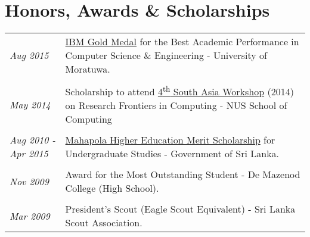 \documentclass[a4paper,10pt]{article}
\begin{document}




\section{Honors, Awards \& Scholarships}
\begin{tabular}{p{3cm}p{13.5cm}}
\emph{Aug 2015} & \href{https://goo.gl/Q3SrQX}{IBM Gold Medal} for the Best Academic Performance in Computer Science \& Engineering - University of Moratuwa.\\\\
\emph{May 2014} & Scholarship to attend \href{https://goo.gl/lDpCe5}{4\textsuperscript{th} South Asia Workshop} (2014) on Research Frontiers in Computing - NUS School of Computing\\\\
\emph{Aug 2010 - Apr 2015} & \href{http://www.gic.gov.lk/gic/index.php?option=com_info&id=1644&task=info&lang=en}{Mahapola Higher Education Merit Scholarship} for Undergraduate Studies - Government of Sri Lanka.\\\\
\emph{Nov 2009} & Award for the Most Outstanding Student - De Mazenod College (High School).\\\\
\emph{Mar 2009} & President’s Scout (Eagle Scout Equivalent) - Sri Lanka Scout Association.\\
\end{tabular}\\
\end{document}
